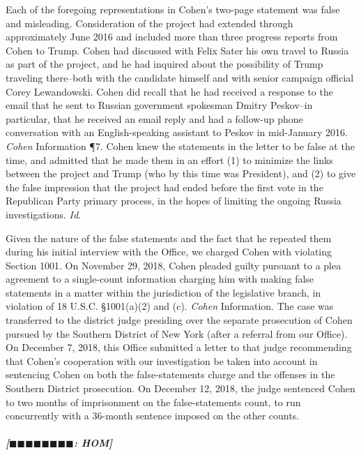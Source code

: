 Each of the foregoing representations in Cohen's two-page statement was false and misleading.
Consideration of the project had extended through approximately June 2016 and included more than three progress reports from Cohen to Trump.
Cohen had discussed with Felix Sater his own travel to Russia as part of the project, and he had inquired about the possibility of Trump traveling there--both with the candidate himself and with senior campaign official Corey Lewandowski.
Cohen did recall that he had received a response to the email that he sent to Russian government spokesman Dmitry Peskov--in particular, that he received an email reply and had a follow-up phone conversation with an English-speaking assistant to Peskov in mid-January 2016.
\textit{Cohen} Information \P 7.
Cohen knew the statements in the letter to be false at the time, and admitted that he made them in an effort (1) to minimize the links between the project and Trump (who by this time was President), and (2) to give the false impression that the project had ended before the first vote in the Republican Party primary process, in the hopes of limiting the ongoing Russia investigations.
\textit{Id}.

Given the nature of the false statements and the fact that he repeated them during his initial interview with the Office, we charged Cohen with violating Section 1001.
On November 29, 2018, Cohen pleaded guilty pursuant to a plea agreement to a single-count information charging him with making false statements in a matter within the jurisdiction of the legislative branch, in violation of 18 U.S.C. \S 1001(a)(2) and (c).
\textit{Cohen} Information.
The case was transferred to the district judge presiding over the separate prosecution of Cohen pursued by the Southern District of New York (after a referral from our Office).
On December 7, 2018, this Office submitted a letter to that judge recommending that Cohen's cooperation with our investigation be taken into account in sentencing Cohen on both the false-statements charge and the offenses in the Southern District prosecution.
On December 12, 2018, the judge sentenced Cohen to two months of imprisonment on the false-statements count, to run concurrently with a 36-month sentence imposed on the other counts.

\subparagraph{[$\blacksquare\blacksquare\blacksquare\blacksquare\blacksquare\blacksquare\blacksquare\blacksquare$: HOM]}


